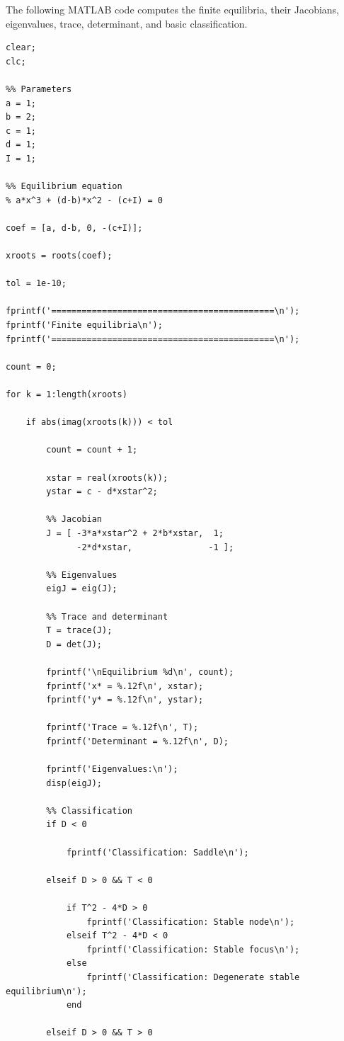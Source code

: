 \documentclass[11pt,a4paper]{article}
\begin{document}
The following MATLAB code computes the finite equilibria, their
Jacobians, eigenvalues, trace, determinant, and basic classification.

\begin{verbatim}
clear;
clc;

%% Parameters
a = 1;
b = 2;
c = 1;
d = 1;
I = 1;

%% Equilibrium equation
% a*x^3 + (d-b)*x^2 - (c+I) = 0

coef = [a, d-b, 0, -(c+I)];

xroots = roots(coef);

tol = 1e-10;

fprintf('============================================\n');
fprintf('Finite equilibria\n');
fprintf('============================================\n');

count = 0;

for k = 1:length(xroots)

    if abs(imag(xroots(k))) < tol

        count = count + 1;

        xstar = real(xroots(k));
        ystar = c - d*xstar^2;

        %% Jacobian
        J = [ -3*a*xstar^2 + 2*b*xstar,  1;
              -2*d*xstar,               -1 ];

        %% Eigenvalues
        eigJ = eig(J);

        %% Trace and determinant
        T = trace(J);
        D = det(J);

        fprintf('\nEquilibrium %d\n', count);
        fprintf('x* = %.12f\n', xstar);
        fprintf('y* = %.12f\n', ystar);

        fprintf('Trace = %.12f\n', T);
        fprintf('Determinant = %.12f\n', D);

        fprintf('Eigenvalues:\n');
        disp(eigJ);

        %% Classification
        if D < 0

            fprintf('Classification: Saddle\n');

        elseif D > 0 && T < 0

            if T^2 - 4*D > 0
                fprintf('Classification: Stable node\n');
            elseif T^2 - 4*D < 0
                fprintf('Classification: Stable focus\n');
            else
                fprintf('Classification: Degenerate stable equilibrium\n');
            end

        elseif D > 0 && T > 0


\end{verbatim}
\end{document}
